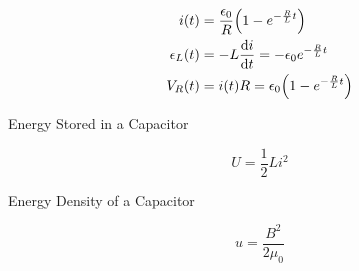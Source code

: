 \documentclass{article}
\begin{document}
\[
    \begin{aligned}
        i(t)          & = \frac{\epsilon_0}{R} \Bigl(1 - e^{-\frac{R}{L}t}\Bigr)             \\
        \epsilon_L(t) & = -L \frac{\mathrm{d}i}{\mathrm{d}t} = -\epsilon_0 e^{-\frac{R}{L}t} \\
        V_R(t)        & = i(t)R = \epsilon_0 \Bigl(1 - e^{-\frac{R}{L}t}\Bigr)
    \end{aligned}
\]

Energy Stored in a Capacitor

\[U= \frac{1}{2} Li^2\]

Energy Density of a Capacitor

\[u = \frac{B^2}{2\mu_0}\]
\end{document}
